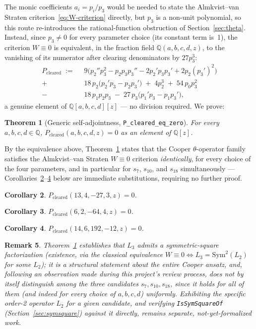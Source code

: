 \documentclass[11pt]{article}
\newtheorem{theorem}{Theorem}[section]
\newtheorem{corollary}[theorem]{Corollary}
\newtheorem{remark}[theorem]{Remark}
\begin{document}
The monic coefficients $a_i = p_i/p_3$ would be needed to state the
Almkvist--van Straten criterion~\eqref{eq:W-criterion} directly, but $p_3$ is
a non-unit polynomial, so this route re-introduces the rational-function
obstruction of Section~\ref{sec:theta}. Instead, since $p_3\neq 0$ for every
parameter choice (its constant term is~1), the criterion $W\equiv 0$ is
equivalent, in the fraction field $\mathbb{Q}(a,b,c,d,z)$, to the vanishing of
its numerator after clearing denominators by $27p_3^3$:
\begin{align}
  \label{eq:Pcleared}
  P_{\mathrm{cleared}} \;:=\;\;
    & 9\bigl(p_2'' p_3^2 - p_2 p_3 p_3'' - 2p_2' p_3 p_3' + 2p_2 (p_3')^2\bigr) \nonumber\\
  {}+{} & 18\, p_2\bigl(p_2' p_3 - p_2 p_3'\bigr) \;+\; 4p_2^3 \;+\; 54\, p_0 p_3^2 \nonumber\\
  {}-{} & 18\, p_1 p_2 p_3 \;-\; 27\, p_3\bigl(p_1' p_3 - p_1 p_3'\bigr),
\end{align}
a genuine element of $\mathbb{Q}[a,b,c,d][z]$ --- no division required. We
prove:

\begin{theorem}[Generic self-adjointness, \lstinline{P_cleared_eq_zero}]
\label{thm:w0}
For \emph{every} $a,b,c,d\in\mathbb{Q}$, $P_{\mathrm{cleared}}(a,b,c,d,z) = 0$
as an element of $\mathbb{Q}[z]$.
\end{theorem}

By the equivalence above, Theorem~\ref{thm:w0} states that the Cooper
$\theta$-operator family satisfies the Almkvist--van Straten $W\equiv 0$
criterion \emph{identically}, for every choice of the four parameters, and in
particular for $s_7$, $s_{10}$, and $s_{18}$ simultaneously ---
Corollaries~\ref{cor:s7}--\ref{cor:s18} below are immediate substitutions,
requiring no further proof.

\begin{corollary}\label{cor:s7} $P_{\mathrm{cleared}}(13,4,-27,3,z)=0$.\end{corollary}
\begin{corollary}\label{cor:s10} $P_{\mathrm{cleared}}(6,2,-64,4,z)=0$.\end{corollary}
\begin{corollary}\label{cor:s18} $P_{\mathrm{cleared}}(14,6,192,-12,z)=0$.\end{corollary}

\begin{remark}
Theorem~\ref{thm:w0} establishes that $L_3$ \emph{admits a} symmetric-square
factorization (existence, via the classical equivalence
$W\equiv0 \Leftrightarrow L_3=\mathrm{Sym}^2(L_2)$ for some $L_2$); it is a
structural statement about the entire Cooper ansatz, and, following an
observation made during this project's review process, does \emph{not by
itself} distinguish among the three candidates $s_7,s_{10},s_{18}$, since it
holds for all of them (and indeed for every choice of $a,b,c,d$) uniformly.
Exhibiting the specific order-2 operator $L_2$ for a given candidate, and
verifying \lstinline{IsSymSquareOf} (Section~\ref{sec:symsquare}) against it
directly, remains separate, not-yet-formalized work.
\end{remark}
\end{document}
